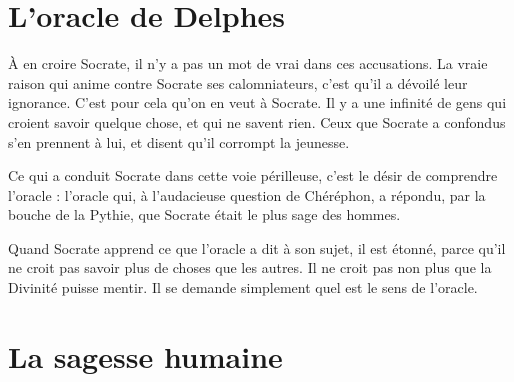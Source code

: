 \documentclass[fontsize=28pt,a4paper]{scrartcl}
\begin{document}


\clearpage

\section{L'oracle de Delphes}

À en croire Socrate, il n'y a pas un mot de vrai dans ces accusations. La vraie raison qui anime contre Socrate ses calomniateurs, c'est qu'il a dévoilé leur ignorance. C'est pour cela qu'on en veut à Socrate. Il y a une infinité de gens qui croient savoir quelque chose, et qui ne savent rien. Ceux que Socrate a confondus s'en prennent à lui, et disent qu'il corrompt la jeunesse.

Ce qui a conduit Socrate dans cette voie périlleuse, c'est le désir de comprendre l'oracle : l'oracle qui, à l'audacieuse question de Chéréphon, a répondu, par la bouche de la Pythie, que Socrate était le plus sage des hommes.

Quand Socrate apprend ce que l'oracle a dit à son sujet, il est étonné, parce qu'il ne croit pas savoir plus de choses que les autres. Il ne croit pas non plus que la Divinité puisse mentir. Il se demande simplement quel est le sens de l'oracle.


\clearpage

\section{La sagesse humaine}

\end{document}
